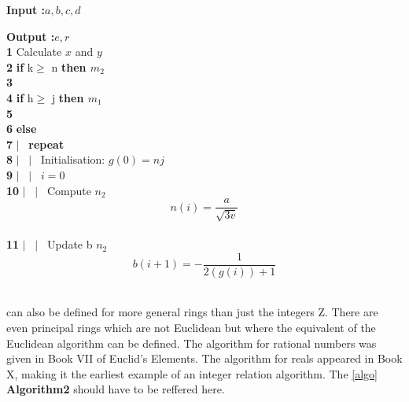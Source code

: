\documentclass{article}
\begin{document}
\noindent\hrulefill 

\normalsize 
\textbf{Input :}$ a, b, c, d$

\textbf{Output :}$e,r$\\
\textbf{1}\hspace{0.25cm}   Calculate $x$ and $y$\\
\textbf{2}\hspace{0.25cm}   \textbf{if} k$\geq$ n  \textbf{then $m_2$}\\
\textbf{3}\\
\textbf{4}\hspace{0.25cm}   \textbf{if} h$\geq$ j  \textbf{then $m_1$}\\
\textbf{5}\\
\textbf{6}\hspace{0.25cm}   \textbf{else}\\ 
\textbf{7}\hspace{0.25cm}   $\mid$ \ \textbf{repeat}\\
\textbf{8}\hspace{0.25cm}   $\mid$ \ $\mid$ \ Initialisation: $g(0) = nj$\\
\textbf{9}\hspace{0.25cm}   $\mid$ \ $\mid$ \ $i = 0$\\
\textbf{10}\hspace{0.05cm}   $\mid$ \ $\mid$ \ Compute $n_2$$$n(i)=\frac{a}{\sqrt{3v}}$$\\
\textbf{11}\hspace{0.05cm}   $\mid$ \ $\mid$ \ Update b $n_2$$$b(i+1)=-\frac{1}{2(g(i))+1}$$\\
\noindent\hrulefill 

\normalsize \noindent
can also be defined for more general rings than just the integers Z. There are
even principal rings which are not Euclidean but where the equivalent of the
Euclidean algorithm can be defined. The algorithm for rational numbers was
given in Book VII of Euclid’s Elements. The algorithm for reals appeared in
Book X, making it the earliest example of an integer relation algorithm.
The \ref{algo} \textbf{Algorithm2} should have to be reffered here.
\end{document}
